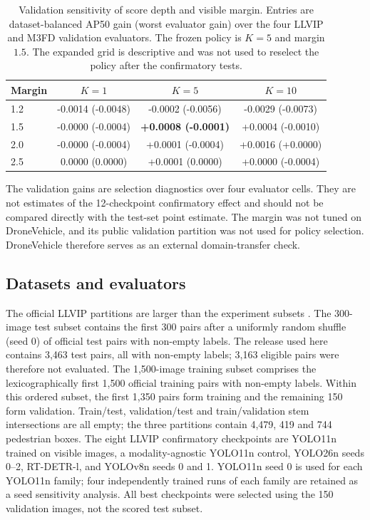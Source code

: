 \documentclass[preprint,11pt]{elsarticle}
\begin{document}
\begin{table}[t]
\centering
\small
\caption{Validation sensitivity of score depth and visible margin. Entries are
dataset-balanced AP50 gain (worst evaluator gain) over the four LLVIP and M3FD
validation evaluators. The frozen policy is \(K=5\) and margin \(1.5\). The
expanded grid is descriptive and was not used to reselect the policy after the
confirmatory tests.}
\label{tab:score-margin}
\begin{tabular}{@{}lccc@{}}
\toprule
Margin & \(K=1\) & \(K=5\) & \(K=10\) \\
\midrule
1.2 & -0.0014 (-0.0048) & -0.0002 (-0.0056) & -0.0029 (-0.0073) \\
1.5 & -0.0000 (-0.0004) & \textbf{+0.0008 (-0.0001)} &
+0.0004 (-0.0010) \\
2.0 & -0.0000 (-0.0004) & +0.0001 (-0.0004) & +0.0016 (+0.0000) \\
2.5 & 0.0000 (0.0000) & +0.0001 (0.0000) & +0.0000 (-0.0004) \\
\bottomrule
\end{tabular}
\end{table}

The validation gains are selection diagnostics over four evaluator cells. They
are not estimates of the 12-checkpoint confirmatory effect and should not be
compared directly with the test-set point estimate. The margin was not tuned
on DroneVehicle, and its public validation partition was not used for policy
selection. DroneVehicle therefore serves as an external domain-transfer check.

\subsection{Datasets and evaluators}

The official LLVIP partitions are larger than the experiment subsets
\cite{jia2021}. The 300-image test subset contains the first 300 pairs after a
uniformly random shuffle (seed 0) of official test pairs with non-empty labels.
The release used here contains 3,463 test pairs, all with non-empty labels;
3,163 eligible pairs were therefore not evaluated.
The 1,500-image training subset comprises the lexicographically first 1,500
official training pairs with non-empty labels. Within this ordered subset, the
first 1,350 pairs form training and the remaining 150 form validation.
Train/test, validation/test and train/validation stem intersections are all
empty; the three partitions contain 4,479, 419 and 744 pedestrian boxes. The
eight LLVIP confirmatory checkpoints are YOLO11n trained on visible images, a
modality-agnostic YOLO11n control, YOLO26n seeds 0--2, RT-DETR-l, and YOLOv8n
seeds 0 and 1. YOLO11n seed 0 is used for each YOLO11n family; four
independently trained runs of each family are retained as a seed sensitivity
analysis. All best checkpoints were selected using the 150 validation images,
not the scored test subset.
\end{document}
